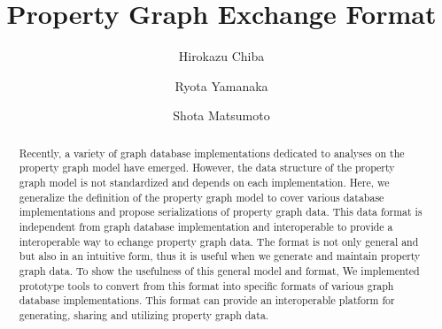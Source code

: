 \documentclass[runningheads]{llncs}
\begin{document}
\newtheorem{defi}[theorem]{Definition}
%
\title{Property Graph Exchange Format}
%
%
\author{Hirokazu Chiba \and Ryota Yamanaka \and Shota Matsumoto}
%
%
%
\maketitle              %
%
\begin{abstract}
Recently, a variety of graph database implementations dedicated to analyses on the property graph model have emerged.
However, the data structure of the property graph model is not standardized and depends on each implementation.
Here, we generalize the definition of the property graph model to cover various database implementations and propose serializations of property graph data. 
This data format is independent from graph database implementation and interoperable to provide a interoperable way to echange property graph data. The format is not only general and but also in an intuitive form, thus it is useful when we generate and maintain property graph data. To show the usefulness of this general model and format, We implemented prototype tools to convert from this format into specific formats of various graph database implementations. This format can provide an interoperable platform for generating, sharing and utilizing property graph data.
\end{abstract}
\end{document}
